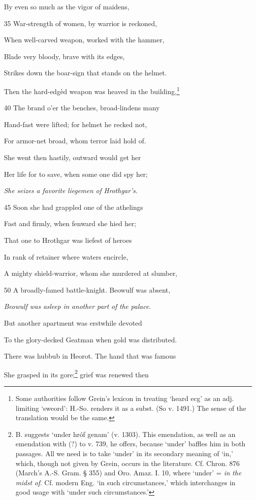 By even so much as the vigor of maidens,

35
War-strength of women, by warrior is reckoned,

When well-carved weapon, worked with the hammer,

Blade very bloody, brave with its edges,

Strikes down the boar-sign that stands on the helmet.

Then the hard-edgèd weapon was heaved in the building,\footnote{Some authorities follow Grein’s lexicon in treating ‘heard ecg’ as an adj.
limiting ‘sweord’: H.-So. renders it as a subst. (So v. 1491.) The sense of
the translation would be the same.}

40
The brand o’er the benches, broad-lindens many

Hand-fast were lifted; for helmet he recked not,

For armor-net broad, whom terror laid hold of.

She went then hastily, outward would get her

Her life for to save, when some one did spy her;

\emph{She seizes a favorite
liegemen of
Hrothgar’s.}

45
Soon she had grappled one of the athelings

Fast and firmly, when fenward she hied her;

That one to Hrothgar was liefest of heroes

In rank of retainer where waters encircle,

A mighty shield-warrior, whom she murdered at slumber,

50
A broadly-famed battle-knight. Beowulf was absent,

\emph{Beowulf was asleep
in another part of
the palace.}

But another apartment was erstwhile devoted

To the glory-decked Geatman when gold was distributed.

There was hubbub in Heorot. The hand that was famous

She grasped in its gore;\footnote{B. suggests ‘under hróf genam’ (v. 1303). This emendation, as well as
an emendation with (?) to v. 739, he offers, because ‘under’ baffles him in
both passages. All we need is to take ‘under’ in its secondary meaning of
‘in,’ which, though not given by Grein, occurs in the literature. Cf. Chron.
876 (March’s A.-S. Gram. § 355) and Oro. Amaz. I. 10, where ‘under’ = \emph{in
the midst of}. Cf. modern Eng. ‘in such circumstances,’ which interchanges
in good usage with ‘under such circumstances.’} grief was renewed then

